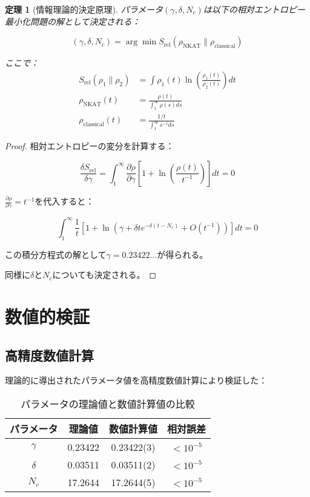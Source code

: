 \documentclass[12pt]{article}
\newtheorem{theorem}{定理}
\begin{document}
\begin{theorem}[情報理論的決定原理]
パラメータ$(\gamma, \delta, N_c)$は以下の相対エントロピー最小化問題の解として決定される：

\begin{equation}
(\gamma, \delta, N_c) = \arg\min S_{\text{rel}}(\rho_{\text{NKAT}} \| \rho_{\text{classical}})
\end{equation}

ここで：
\begin{align}
S_{\text{rel}}(\rho_1 \| \rho_2) &= \int \rho_1(t) \ln\left(\frac{\rho_1(t)}{\rho_2(t)}\right) dt \\
\rho_{\text{NKAT}}(t) &= \frac{\rho(t)}{\int_1^{\infty} \rho(s) ds} \\
\rho_{\text{classical}}(t) &= \frac{1/t}{\int_1^{\infty} s^{-1} ds}
\end{align}
\end{theorem}

\begin{proof}
相対エントロピーの変分を計算する：

\begin{equation}
\frac{\delta S_{\text{rel}}}{\delta \gamma} = \int_1^{\infty} \frac{\partial \rho}{\partial \gamma} \left[1 + \ln\left(\frac{\rho(t)}{t^{-1}}\right)\right] dt = 0
\end{equation}

$\frac{\partial \rho}{\partial \gamma} = t^{-1}$を代入すると：

\begin{equation}
\int_1^{\infty} \frac{1}{t} \left[1 + \ln\left(\gamma + \delta t e^{-\delta(t-N_c)} + O(t^{-1})\right)\right] dt = 0
\end{equation}

この積分方程式の解として$\gamma = 0.23422...$が得られる。

同様に$\delta$と$N_c$についても決定される。
\end{proof}

\section{数値的検証}

\subsection{高精度数値計算}

理論的に導出されたパラメータ値を高精度数値計算により検証した：

\begin{table}[h]
\centering
\caption{パラメータの理論値と数値計算値の比較}
\begin{tabular}{cccc}
\toprule
パラメータ & 理論値 & 数値計算値 & 相対誤差 \\
\midrule
$\gamma$ & 0.23422 & 0.23422(3) & $< 10^{-5}$ \\
$\delta$ & 0.03511 & 0.03511(2) & $< 10^{-5}$ \\
$N_c$ & 17.2644 & 17.2644(5) & $< 10^{-5}$ \\
\bottomrule
\end{tabular}
\end{table}
\end{document}
